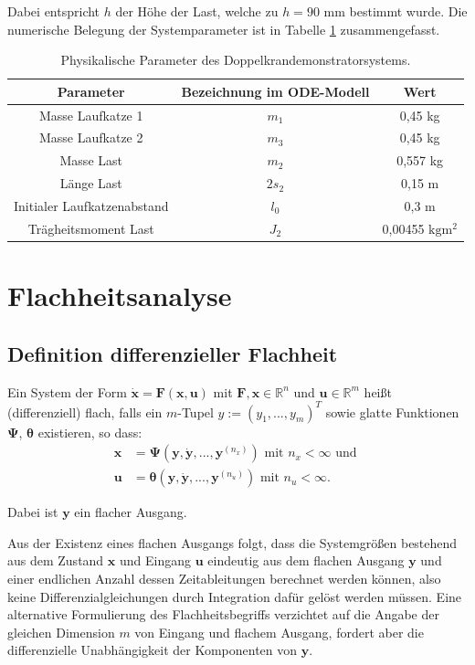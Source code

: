 Dabei entspricht $h$ der Höhe der Last, welche zu $h = 90$ mm
bestimmt wurde. Die numerische Belegung der Systemparameter ist in Tabelle \ref{tab:sys_params} zusammengefasst.

\begin{table}[htbp]%
	\centering
	\caption{Physikalische Parameter des Doppelkrandemonstratorsystems.}
	\label{tab:sys_params}
	\begin{tabular}{c c c} 
		Parameter & Bezeichnung im ODE-Modell & Wert \\ 
		\hline
		Masse Laufkatze 1 & $m_1$ & 0,45 \si{\kg} \\
		Masse Laufkatze 2 & $m_3$ & 0,45 \si{\kg} \\
 		Masse Last & $m_2$ & 0,557 \si{\kg} \\
		Länge Last & $2 s_2$ & 0,15 \si{\m} \\
		Initialer Laufkatzenabstand & $l_0$ & 0,3 \si{\m} \\
		Trägheitsmoment Last & $J_2$ & 0,00455 $\si{\kg\m^2}$ \\
		\bottomrule
	\end{tabular}
\end{table}

\chapter{Flachheitsanalyse}

\section{Definition differenzieller Flachheit}\label{sec:Def_flatness}

Ein System der Form $\dot{\mathbf{x}} = \mathbf{F}(\mathbf{x}, \mathbf{u})$ mit $\mathbf{F}, \mathbf{x} \in \mathbb{R}^n$ und $\mathbf{u} \in \mathbb{R}^m$ heißt (differenziell) flach, falls ein $m$-Tupel $y := (y_1, ..., y_m)^T$ sowie glatte Funktionen $\mathbf{\Psi}$, $\boldsymbol{\theta}$ existieren, so dass:
\begin{align}
\mathbf{x} &= \mathbf{\Psi}(\mathbf{y}, \dot{\mathbf{y}}, ..., \mathbf{y}^{(n_x)}) \text{ mit } n_x < \infty \text{ und } \\
\mathbf{u} &= \boldsymbol{\theta}(\mathbf{y}, \dot{\mathbf{y}}, ..., \mathbf{y}^{(n_u)}) \text{ mit } n_u < \infty.
\end{align}

Dabei ist $\mathbf{y}$ ein flacher Ausgang. 

Aus der Existenz eines flachen Ausgangs folgt, dass die Systemgrößen bestehend aus dem Zustand $\mathbf{x}$ und Eingang $\mathbf{u}$ eindeutig aus dem flachen Ausgang $\mathbf{y}$ und einer endlichen Anzahl dessen Zeitableitungen berechnet werden können, also keine Differenzialgleichungen durch Integration dafür gelöst werden müssen. Eine alternative Formulierung des Flachheitsbegriffs verzichtet auf die Angabe der gleichen Dimension $m$ von Eingang und flachem Ausgang, fordert aber die differenzielle Unabhängigkeit der Komponenten von $\mathbf{y}$.

